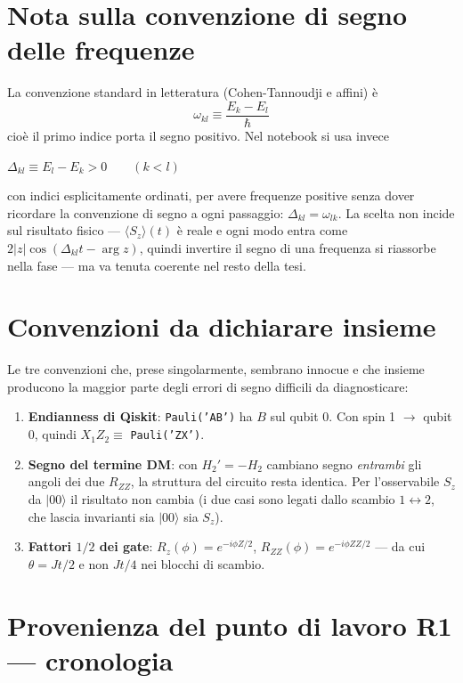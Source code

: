 \documentclass[11pt,a4paper]{article}
\begin{document}
\section{Nota sulla convenzione di segno delle frequenze}

La convenzione standard in letteratura (Cohen-Tannoudji e affini) è
$$\omega_{kl}\equiv\frac{E_k-E_l}{\hbar}$$
cioè il primo indice porta il segno positivo. Nel notebook si usa
invece
\begin{keyeq}
\centering
$\Delta_{kl}\equiv E_l-E_k>0 \qquad (k<l)$
\end{keyeq}
con indici esplicitamente ordinati, per avere frequenze positive senza
dover ricordare la convenzione di segno a ogni passaggio:
$\Delta_{kl}=\omega_{lk}$. La scelta non incide sul risultato fisico
--- $\langle S_z\rangle(t)$ è reale e ogni modo entra come
$2|z|\cos(\Delta_{kl}t-\arg z)$, quindi invertire il segno di una
frequenza si riassorbe nella fase --- ma va tenuta coerente nel resto
della tesi.

\section{Convenzioni da dichiarare insieme}

Le tre convenzioni che, prese singolarmente, sembrano innocue e che
insieme producono la maggior parte degli errori di segno difficili da
diagnosticare:

\begin{enumerate}[leftmargin=1.4em,itemsep=0.3em]
\item \textbf{Endianness di Qiskit}: \texttt{Pauli('AB')} ha $B$ sul
qubit 0. Con spin 1 $\to$ qubit 0, quindi $X_1Z_2\equiv$
\texttt{Pauli('ZX')}.
\item \textbf{Segno del termine DM}: con $H_2'=-H_2$ cambiano segno
\emph{entrambi} gli angoli dei due $R_{ZZ}$, la struttura del circuito
resta identica. Per l'osservabile $S_z$ da $|00\rangle$ il risultato
non cambia (i due casi sono legati dallo scambio $1\leftrightarrow2$,
che lascia invarianti sia $|00\rangle$ sia $S_z$).
\item \textbf{Fattori $1/2$ dei gate}: $R_z(\phi)=e^{-i\phi Z/2}$,
$R_{ZZ}(\phi)=e^{-i\phi ZZ/2}$ --- da cui $\theta=Jt/2$ e non $Jt/4$
nei blocchi di scambio.
\end{enumerate}

\section{Provenienza del punto di lavoro R1 --- cronologia}
\end{document}
